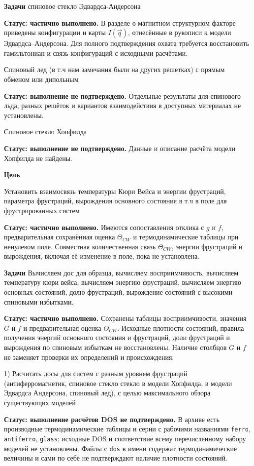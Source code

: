 \documentclass[utf8, babel, sor, jor, amsmath, amssymb, reprint]{elsarticle} %
\begin{document}
\textbf{Задачи} 
спиновое стекло Эдвардса-Андерсона 

\textbf{Статус: частично выполнено.} В разделе о магнитном структурном факторе приведены конфигурации и карты $I(\vec q)$, отнесённые в рукописи к модели Эдвардса--Андерсона. Для полного подтверждения охвата требуется восстановить гамильтониан и связь конфигураций с исходными расчётами.

Спиновый лед (в т.ч нам замечания были на других решетках) с прямым обменом или дипольным

\textbf{Статус: выполнение не подтверждено.} Отдельные результаты для спинового льда, разных решёток и вариантов взаимодействия в доступных материалах не установлены.

Спиновое стекло Хопфилда

\textbf{Статус: выполнение не подтверждено.} Данные и описание расчёта модели Хопфилда не найдены.

\textbf{Цель} 

Установить взаимосвязь температуры Кюри Вейса и энергии фрустраций, параметра фрустраций, вырождения основного состояния в т.ч в поле для фрустрированных систем

\textbf{Статус: частично выполнено.} Имеются сопоставления отклика с $g$ и $f$, предварительная сохранённая оценка $\Theta_{CW}$ и термодинамические таблицы при ненулевом поле. Совместная количественная связь $\Theta_{CW}$, энергии фрустраций и вырождения, включая её изменение в поле, пока не установлена.

\textbf{Задачи}
Вычисляем дос для образца, вычисляем восприимчивость, вычисляем температуру кюри вейса, вычисляем энергию фрустраций, вычисляем энергию основных состояний, долю фрустраций, вырождение состояний с высокими спиновыми избытками.

\textbf{Статус: частично выполнено.} Сохранены таблицы восприимчивости, значения $G$ и $f$ и предварительная оценка $\Theta_{CW}$. Исходные плотности состояний, правила получения энергий основного состояния и фрустраций, доли фрустраций и вырождения по спиновым избыткам не восстановлены. Наличие столбцов $G$ и $f$ не заменяет проверки их определений и происхождения.


1) Расчитать досы для систем с разным уровнем фрустраций (антиферромагнетик, спиновое стекло стекло в модели Хопфилда, в модели Эдвардса Андерсона, спиновый лед), с целью максимального обзора существующих моделей

\textbf{Статус: выполнение расчётов DOS не подтверждено.} В архиве есть производные термодинамические таблицы и серии с рабочими названиями \texttt{ferro}, \texttt{antiferro}, \texttt{glass}; исходные DOS и соответствие всему перечисленному набору моделей не установлены. Файлы с \texttt{dos} в имени содержат термодинамические величины и сами по себе не подтверждают наличие плотности состояний.
\end{document}
